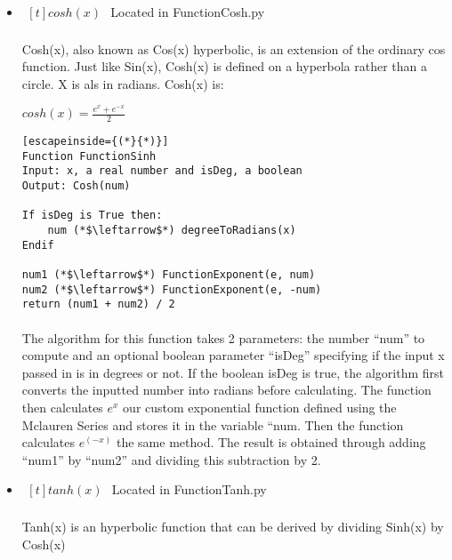 \begin{itemize}
        \item $\begin{aligned}[t]
            cosh(x)
        \end{aligned}$
            Located in FunctionCosh.py

            \paragraph{}
            Cosh(x), also known as Cos(x) hyperbolic, is an extension of the ordinary cos function. Just like Sin(x), Cosh(x) is defined on a hyperbola rather than a circle. X is als   in radians. Cosh(x) is:

            \begin{center}
                $cosh(x) = \frac{e^x+e^{-x}}{2}$
            \end{center}

            \begin{lstlisting}[escapeinside={(*}{*)}]
Function FunctionSinh
Input: x, a real number and isDeg, a boolean
Output: Cosh(num)

If isDeg is True then:
    num (*$\leftarrow$*) degreeToRadians(x)
Endif

num1 (*$\leftarrow$*) FunctionExponent(e, num)
num2 (*$\leftarrow$*) FunctionExponent(e, -num)
return (num1 + num2) / 2
            \end{lstlisting}

            \paragraph{}
            The algorithm for this function takes 2 parameters: the number “num” to compute and an optional boolean parameter “isDeg” specifying if the input x passed in is in degrees or not. If the boolean isDeg is true, the algorithm first converts the inputted number into radians before calculating. The function then calculates $e^x$ our custom exponential function defined using the Mclauren Series and stores it in the variable “num. Then the function calculates $e^(-x)$ the same method. The result is obtained through adding “num1” by “num2” and dividing this subtraction by 2.

        \item $\begin{aligned}[t]
            tanh(x)
        \end{aligned}$
            Located in FunctionTanh.py

            \paragraph{}
            Tanh(x) is an hyperbolic function that can be derived by dividing Sinh(x) by Cosh(x)


\end{itemize}
